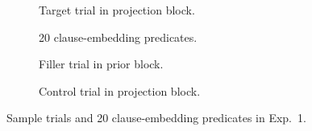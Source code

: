\documentclass[11pt,fleqn]{article}
\newcommand{\6}{\mbox{$[\hspace*{-.6mm}[$}}
\newcommand{\9}{\mbox{$]\hspace*{-.6mm}]$}}
\begin{document}
\begin{figure}[h!]
\begin{subfigure}[t]{0.5\textwidth}
\caption{Target trial in projection block.}\label{fig-exp1-projection}
 \end{subfigure}
 \par\bigskip
\begin{subfigure}[t]{1\textwidth}
        \centering
\caption{20 clause-embedding predicates.}\label{fig-exp1-preds}
\end{subfigure}
\par\bigskip
\begin{subfigure}[t]{0.5\textwidth}
        \centering
{}
\caption{Filler trial in prior block.}\label{fig-exp1-prior-filler}
 \end{subfigure}%
\begin{subfigure}[t]{0.5\textwidth}
\centering
{} 
\caption{Control trial in projection block.}\label{fig-exp1-projection-control}
\end{subfigure}


\caption{Sample trials and 20 clause-embedding predicates in Exp.~1.}
\end{figure}
\end{document}
